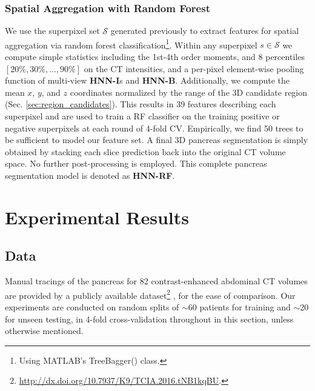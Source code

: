 \documentclass[journal]{IEEEtran}
\def \Npatients {82}
\def \Ntrain {$\sim$60}
\def \Ntest {$\sim$20}
\begin{document}
\subsubsection{Spatial Aggregation with Random Forest}\label{sec:aggregation}
We use the superpixel set $\mathcal{S}$ generated previously to extract features for spatial aggregation via random forest classification\footnote{\scriptsize Using MATLAB's TreeBagger() class.}. Within any superpixel $s \in \mathcal{S}$ we compute simple statistics including the 1st-4th order moments, and 8 percentiles $[20\%, 30\%, \dots, 90\%]$ on the CT intensities, and a per-pixel element-wise pooling function of multi-view \textbf{HNN-I}s and \textbf{HNN-B}. Additionally, we compute the mean $x$, $y$, and $z$ coordinates normalized by the range of the 3D candidate region (Sec. \ref{sec:region_candidates}). This results in 39 features describing each superpixel and are used to train a RF classifier on the training positive or negative superpixels at each round of 4-fold CV. %
Empirically, we find 50 trees to be sufficient to model our feature set. A final 3D pancreas segmentation is simply obtained by stacking each slice prediction back into the original CT volume space. No further post-processing is employed. %
This complete pancreas segmentation model is denoted as \textbf{HNN-RF}. 
\section{Experimental Results} \label{sec:results}
\subsection{Data} 
\noindent Manual tracings of the pancreas for \Npatients{} contrast-enhanced abdominal CT volumes are provided by a publicly available dataset\footnote{\scriptsize\url{http://dx.doi.org/10.7937/K9/TCIA.2016.tNB1kqBU}.} \cite{roth2015deeporgan}, for the ease of comparison. Our experiments are conducted on random splits of \Ntrain{} patients for training and \Ntest{} for unseen testing, in 4-fold cross-validation throughout in this section, unless otherwise mentioned. %
\end{document}
